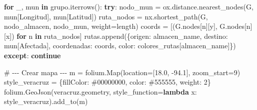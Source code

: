 \documentclass[
  spanish,
  us-letterpaper,
]{scrreprt}
\newenvironment{Shaded}{\begin{snugshade}}{\end{snugshade}}
\newcommand{\CommentTok}[1]{\textcolor[rgb]{0.37,0.37,0.37}{#1}}
\newcommand{\ControlFlowTok}[1]{\textcolor[rgb]{0.00,0.23,0.31}{\textbf{#1}}}
\newcommand{\DecValTok}[1]{\textcolor[rgb]{0.68,0.00,0.00}{#1}}
\newcommand{\FloatTok}[1]{\textcolor[rgb]{0.68,0.00,0.00}{#1}}
\newcommand{\KeywordTok}[1]{\textcolor[rgb]{0.00,0.23,0.31}{\textbf{#1}}}
\newcommand{\NormalTok}[1]{\textcolor[rgb]{0.00,0.23,0.31}{#1}}
\newcommand{\OperatorTok}[1]{\textcolor[rgb]{0.37,0.37,0.37}{#1}}
\newcommand{\StringTok}[1]{\textcolor[rgb]{0.13,0.47,0.30}{#1}}
\numberwithin{equation}{chapter} %
\begin{document}
\begin{Shaded}
\begin{Highlighting}[]
    \ControlFlowTok{for}\NormalTok{ \_, mun }\KeywordTok{in}\NormalTok{ grupo.iterrows():}
        \ControlFlowTok{try}\NormalTok{:}
\NormalTok{            nodo\_mun }\OperatorTok{=}\NormalTok{ ox.distance.nearest\_nodes(G,}
\NormalTok{             mun[}\StringTok{\textquotesingle{}Longitud\textquotesingle{}}\NormalTok{], mun[}\StringTok{\textquotesingle{}Latitud\textquotesingle{}}\NormalTok{])}
\NormalTok{            ruta\_nodos }\OperatorTok{=}\NormalTok{ nx.shortest\_path(G,}
\NormalTok{             nodo\_almacen, nodo\_mun, weight}\OperatorTok{=}\StringTok{\textquotesingle{}length\textquotesingle{}}\NormalTok{)}
\NormalTok{            coords }\OperatorTok{=}\NormalTok{ [(G.nodes[n][}\StringTok{\textquotesingle{}y\textquotesingle{}}\NormalTok{],}
\NormalTok{             G.nodes[n][}\StringTok{\textquotesingle{}x\textquotesingle{}}\NormalTok{]) }\ControlFlowTok{for}\NormalTok{ n }\KeywordTok{in}\NormalTok{ ruta\_nodos]}
\NormalTok{            rutas.append(\{}\StringTok{\textquotesingle{}origen\textquotesingle{}}\NormalTok{: almacen\_name,}
             \StringTok{\textquotesingle{}destino\textquotesingle{}}\NormalTok{: mun[}\StringTok{\textquotesingle{}Afectada\textquotesingle{}}\NormalTok{],}
             \StringTok{\textquotesingle{}coordenadas\textquotesingle{}}\NormalTok{: coords, }
             \StringTok{\textquotesingle{}color\textquotesingle{}}\NormalTok{: colores\_rutas[almacen\_name]\})}
        \ControlFlowTok{except}\NormalTok{:}
            \ControlFlowTok{continue}

\CommentTok{\# {-}{-}{-} Crear mapa {-}{-}{-}}
\NormalTok{m }\OperatorTok{=}\NormalTok{ folium.Map(location}\OperatorTok{=}\NormalTok{[}\FloatTok{18.0}\NormalTok{, }\OperatorTok{{-}}\FloatTok{94.1}\NormalTok{], zoom\_start}\OperatorTok{=}\DecValTok{9}\NormalTok{)}
\NormalTok{style\_veracruz }\OperatorTok{=}\NormalTok{ \{}\StringTok{\textquotesingle{}fillColor\textquotesingle{}}\NormalTok{: }\StringTok{\textquotesingle{}\#00000000\textquotesingle{}}\NormalTok{,}
 \StringTok{\textquotesingle{}color\textquotesingle{}}\NormalTok{: }\StringTok{\textquotesingle{}\#555555\textquotesingle{}}\NormalTok{, }\StringTok{\textquotesingle{}weight\textquotesingle{}}\NormalTok{: }\DecValTok{2}\NormalTok{\}}
\NormalTok{folium.GeoJson(veracruz.geometry,}
\NormalTok{ style\_function}\OperatorTok{=}\KeywordTok{lambda}\NormalTok{ x: style\_veracruz).add\_to(m)}


\end{Highlighting}
\end{Shaded}
\end{document}
